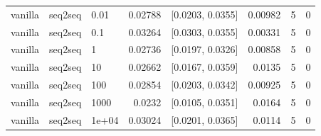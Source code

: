 \documentclass[10pt]{article}
\begin{document}
{\begin{longtable}{lllrlrrr}
vanilla & seq2seq & 0.01 & 0.02788 & [0.0203, 0.0355] & 0.00982 & 5 & 0\\
vanilla & seq2seq & 0.1 & 0.03264 & [0.0303, 0.0355] & 0.00331 & 5 & 0\\
vanilla & seq2seq & 1 & 0.02736 & [0.0197, 0.0326] & 0.00858 & 5 & 0\\
vanilla & seq2seq & 10 & 0.02662 & [0.0167, 0.0359] & 0.0135 & 5 & 0\\
vanilla & seq2seq & 100 & 0.02854 & [0.0203, 0.0342] & 0.00925 & 5 & 0\\
vanilla & seq2seq & 1000 & 0.0232 & [0.0105, 0.0351] & 0.0164 & 5 & 0\\
vanilla & seq2seq & 1e+04 & 0.03024 & [0.0201, 0.0365] & 0.0114 & 5 & 0\\
\bottomrule
\end{longtable}
}
\end{document}
